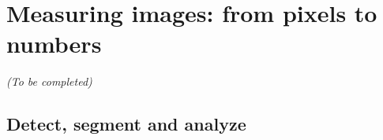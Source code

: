 \section{Measuring images: from pixels to numbers}
\label{sec:computation_biology}

\begin{center}
	\textit{(To be completed)}
\end{center}

\subsection{Detect, segment and analyze}
\label{subsec:intro_pipeline}





